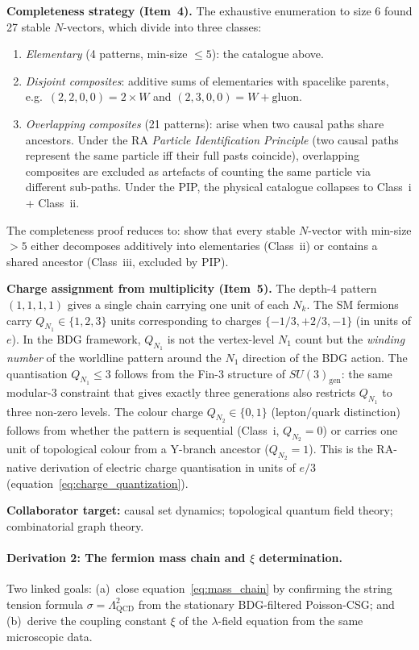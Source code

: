 \documentclass[11pt,a4paper]{article}
\begin{document}
\textbf{Completeness strategy (Item~4).}
The exhaustive enumeration to size 6 found 27 stable $N$-vectors, which divide
into three classes:
\begin{enumerate}[noitemsep,label=\roman*.]
  \item \emph{Elementary} (4 patterns, min-size $\leq 5$): the catalogue above.
  \item \emph{Disjoint composites}: additive sums of elementaries with spacelike
  parents, e.g.\ $(2,2,0,0) = 2\times W$ and $(2,3,0,0) = W + \mathrm{gluon}$.
  \item \emph{Overlapping composites} (21 patterns): arise when two causal paths
  share ancestors. Under the RA \emph{Particle Identification Principle}
  (two causal paths represent the same particle iff their full pasts coincide),
  overlapping composites are excluded as artefacts of counting the same
  particle via different sub-paths. Under the PIP, the physical catalogue
  collapses to Class~i + Class~ii.
\end{enumerate}
The completeness proof reduces to: show that every stable $N$-vector with
min-size $> 5$ either decomposes additively into elementaries (Class~ii) or
contains a shared ancestor (Class~iii, excluded by PIP).

\textbf{Charge assignment from multiplicity (Item~5).}
The depth-4 pattern $(1,1,1,1)$ gives a single chain carrying one unit of
each $N_k$. The SM fermions carry $Q_{N_1} \in \{1,2,3\}$ units corresponding
to charges $\{-1/3, +2/3, -1\}$ (in units of $e$). In the BDG framework,
$Q_{N_1}$ is not the vertex-level $N_1$ count but the \emph{winding number}
of the worldline pattern around the $N_1$ direction of the BDG action. The
quantisation $Q_{N_1} \leq 3$ follows from the Fin-3 structure of
$SU(3)_{\mathrm{gen}}$: the same modular-3 constraint that gives exactly
three generations also restricts $Q_{N_1}$ to three non-zero levels.
The colour charge $Q_{N_2} \in \{0,1\}$ (lepton/quark distinction) follows
from whether the pattern is sequential (Class~i, $Q_{N_2}=0$) or carries
one unit of topological colour from a Y-branch ancestor ($Q_{N_2}=1$).
This is the RA-native derivation of electric charge quantisation in
units of $e/3$ (equation~\eqref{eq:charge_quantization}).

\textbf{Collaborator target:} causal set dynamics; topological quantum field theory;
combinatorial graph theory.

\paragraph{Derivation 2: The fermion mass chain and $\xi$ determination.}
Two linked goals: (a)~close equation~\eqref{eq:mass_chain} by confirming
the string tension formula $\sigma = \Lambda_{\mathrm{QCD}}^2$ from the
stationary BDG-filtered Poisson-CSG; and (b)~derive the coupling constant
$\xi$ of the $\lambda$-field equation from the same microscopic data.
\end{document}
